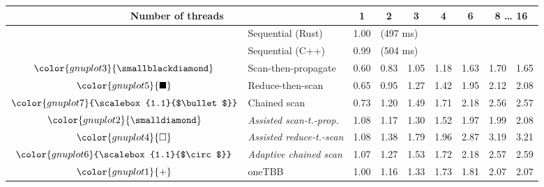 \begin{tabular}{clrrrrrrr}
\toprule
\multicolumn{2}{c}{\textbf{Number of threads}} & \multicolumn{1}{c}{\textbf{ 1 }} & \multicolumn{1}{c}{\textbf{ 2 }} & \multicolumn{1}{c}{\textbf{ 3 }} & \multicolumn{1}{c}{\textbf{ 4 }} & \multicolumn{1}{c}{\textbf{ 6 }} & \multicolumn{2}{c}{\textbf{ 8 } \dots \textbf{ 16 }} \\
\midrule
& Sequential (Rust) & \multicolumn{1}{r}{ 1.00 } & \multicolumn{ 6 }{l}{(497 ms)} \\
& Sequential (C++) & \multicolumn{1}{r}{ 0.99 } & \multicolumn{ 6 }{l}{(504 ms)} \\
\rowcolor{gnuplot3!10}$\color{gnuplot3}{\smallblackdiamond}$ & Scan-then-propagate & \cellcolor{gnuplot3!10} 0.60 & \cellcolor{gnuplot3!10} 0.83 & \cellcolor{gnuplot3!10} 1.05 & \cellcolor{gnuplot3!10} 1.18 & \cellcolor{gnuplot3!10} 1.63 & \cellcolor{gnuplot3!10} 1.70 & \cellcolor{gnuplot3!10} 1.65 \\
\rowcolor{gnuplot5!10}$\color{gnuplot5}{\blacksquare}$ & Reduce-then-scan & \cellcolor{gnuplot5!10} 0.65 & \cellcolor{gnuplot5!10} 0.95 & \cellcolor{gnuplot5!10} 1.27 & \cellcolor{gnuplot5!10} 1.42 & \cellcolor{gnuplot5!10} 1.95 & \cellcolor{gnuplot5!10} 2.12 & \cellcolor{gnuplot5!10} 2.08 \\
\rowcolor{gnuplot7!10}$\color{gnuplot7}{\scalebox{1.1}{$\bullet$}}$ & Chained scan & \cellcolor{gnuplot7!10} 0.73 & \cellcolor{gnuplot7!10} 1.20 & \cellcolor{gnuplot7!10} 1.49 & \cellcolor{gnuplot7!10} 1.71 & \cellcolor{gnuplot7!10} 2.18 & \cellcolor{gnuplot7!10} 2.56 & \cellcolor{gnuplot7!10} 2.57 \\
\rowcolor{gnuplot2!30}$\color{gnuplot2}{\smalldiamond}$ & \textit{Assisted scan-t.-prop.} & \cellcolor{gnuplot2!30} 1.08 & \cellcolor{gnuplot2!30} 1.17 & \cellcolor{gnuplot2!30} 1.30 & \cellcolor{gnuplot2!30} 1.52 & \cellcolor{gnuplot2!30} 1.97 & \cellcolor{gnuplot2!30} 1.99 & \cellcolor{gnuplot2!30} 2.08 \\
\rowcolor{gnuplot4!30}$\color{gnuplot4}{\square}$ & \textit{Assisted reduce-t.-scan} & \cellcolor{gnuplot4!30} 1.08 & \cellcolor{gnuplot4!30} 1.38 & \cellcolor{gnuplot4!30} 1.79 & \cellcolor{gnuplot4!30} 1.96 & \cellcolor{gnuplot4!30} 2.87 & \cellcolor{gnuplot4!30} 3.19 & \cellcolor{gnuplot4!30} 3.21 \\
\rowcolor{gnuplot6!30}$\color{gnuplot6}{\scalebox{1.1}{$\circ$}}$ & \textit{Adaptive chained scan} & \cellcolor{gnuplot6!30} 1.07 & \cellcolor{gnuplot6!30} 1.27 & \cellcolor{gnuplot6!30} 1.53 & \cellcolor{gnuplot6!30} 1.72 & \cellcolor{gnuplot6!30} 2.18 & \cellcolor{gnuplot6!30} 2.57 & \cellcolor{gnuplot6!30} 2.59 \\
\rowcolor{gnuplot1!10}$\color{gnuplot1}{+}$ & oneTBB & \cellcolor{gnuplot1!10} 1.00 & \cellcolor{gnuplot1!10} 1.16 & \cellcolor{gnuplot1!10} 1.33 & \cellcolor{gnuplot1!10} 1.73 & \cellcolor{gnuplot1!10} 1.81 & \cellcolor{gnuplot1!10} 2.07 & \cellcolor{gnuplot1!10} 2.07 \\
\bottomrule
\end{tabular}
